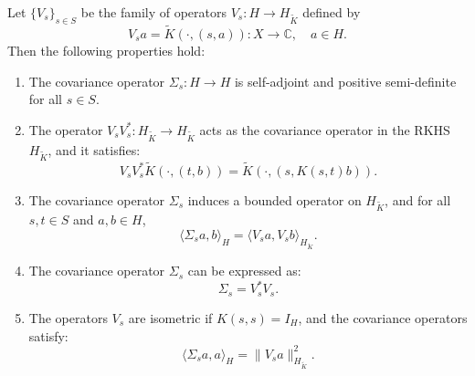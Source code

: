 \documentclass[10pt,a4paper]{amsart}
\begin{document}
\begin{theorem}
\label{thm:covariance_operators}
Let \( \{ V_s \}_{s \in S} \) be the family of operators \( V_s: H \to H_{\tilde{K}} \) defined by
\[
V_s a = \tilde{K}(\cdot, (s, a)): X \to \mathbb{C}, \quad a \in H.
\]
Then the following properties hold:
\begin{enumerate}
    \item The covariance operator \( \Sigma_s: H \to H \) is self-adjoint and positive semi-definite for all \( s \in S \).
    \item The operator \( V_s V_s^*: H_{\tilde{K}} \to H_{\tilde{K}} \) acts as the covariance operator in the RKHS \( H_{\tilde{K}} \), and it satisfies:
    \[
    V_s V_s^* \tilde{K}(\cdot, (t, b)) = \tilde{K}(\cdot, (s, K(s,t) b)).
    \]
    \item The covariance operator \( \Sigma_s \) induces a bounded operator on \( H_{\tilde{K}} \), and for all \( s, t \in S \) and \( a, b \in H \),
    \[
    \langle \Sigma_s a, b \rangle_H = \langle V_s a, V_s b \rangle_{H_{\tilde{K}}}.
    \]
    \item The covariance operator \( \Sigma_s \) can be expressed as:
    \[
    \Sigma_s = V_s^* V_s.
    \]
    \item The operators \( V_s \) are isometric if \( K(s,s) = I_H \), and the covariance operators satisfy:
    \[
    \langle \Sigma_s a, a \rangle_H = \| V_s a \|_{H_{\tilde{K}}}^2.
    \]
\end{enumerate}
\end{theorem}
\end{document}
